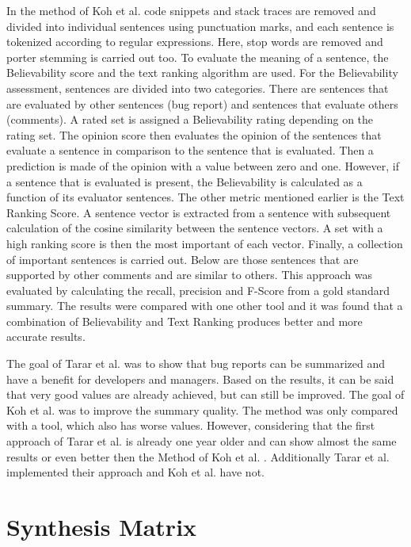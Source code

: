 \documentclass[a4paper,10pt, bibliography=totocnumbered]{scrreprt}
\begin{document}
In the method of Koh et al. \cite{koh} code snippets and stack traces are removed and divided into individual sentences using punctuation marks, and each sentence is tokenized according to regular expressions. Here, stop words are removed and porter stemming is carried out too. To evaluate the meaning of a sentence, the Believability score and the text ranking algorithm are used. For the Believability assessment, sentences are divided into two categories. There are sentences that are evaluated by other sentences (bug report) and sentences that evaluate others (comments). A rated set is assigned a Believability rating depending on the rating set. The opinion score then evaluates the opinion of the sentences that evaluate a sentence in comparison to the sentence that is evaluated. Then a prediction is made of the opinion with a value between zero and one. However, if a sentence that is evaluated is present, the Believability is calculated as a function of its evaluator sentences. The other metric mentioned earlier is the Text Ranking Score. A sentence vector is extracted from a sentence with subsequent calculation of the cosine similarity between the sentence vectors. A set with a high ranking score is then the most important of each vector. Finally, a collection of important sentences is carried out. Below are those sentences that are supported by other comments and are similar to others. This approach was evaluated by calculating the recall, precision and F-Score from a gold standard summary. The results were compared with one other tool and it was found that a combination of Believability and Text Ranking produces better and more accurate results. \linebreak

The goal of Tarar et al. \cite{tarar} was to show that bug reports can be summarized and have a benefit for developers and managers. Based on the results, it can be said that very good values are already achieved, but can still be improved. The goal of Koh et al. \cite{koh} was to improve the summary quality. The method was only compared with a tool, which also has worse values. However, considering that the first approach of Tarar et al. \cite{tarar} is already one year older and can show almost the same results or even better then the Method of Koh et al. \cite{koh}. Additionally Tarar et al. \cite{tarar} implemented their approach and Koh et al. \cite{koh} have not.


\section{Synthesis Matrix}
\end{document}

